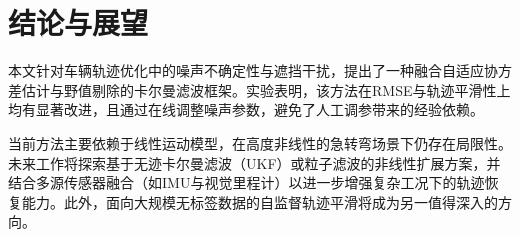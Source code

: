 \section{结论与展望}

本文针对车辆轨迹优化中的噪声不确定性与遮挡干扰，提出了一种融合自适应协方差估计与野值剔除的卡尔曼滤波框架。实验表明，该方法在RMSE与轨迹平滑性上均有显著改进，且通过在线调整噪声参数，避免了人工调参带来的经验依赖。

当前方法主要依赖于线性运动模型，在高度非线性的急转弯场景下仍存在局限性。未来工作将探索基于无迹卡尔曼滤波（UKF）或粒子滤波的非线性扩展方案，并结合多源传感器融合（如IMU与视觉里程计）以进一步增强复杂工况下的轨迹恢复能力。此外，面向大规模无标签数据的自监督轨迹平滑将成为另一值得深入的方向。